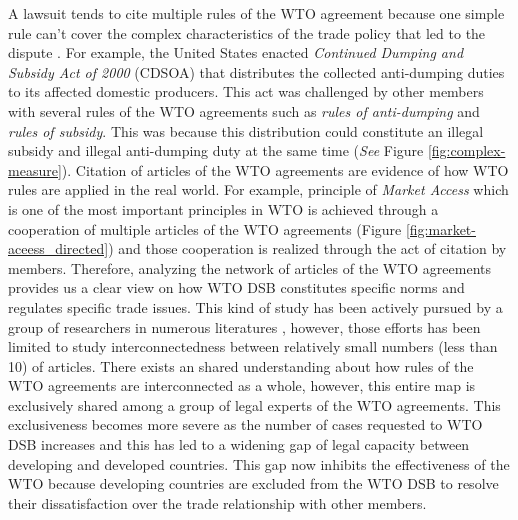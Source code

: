 A lawsuit tends to cite multiple rules of the WTO agreement because one simple rule can't cover the complex characteristics of the trade policy that led to the dispute \citep{palmeter2004dispute}.
For example, the United States enacted \textit{Continued Dumping and Subsidy Act of 2000} (CDSOA) that distributes
the collected anti-dumping duties to its affected domestic producers.
This act was challenged by other members with several rules of
the WTO agreements such as \textit{rules of anti-dumping} and \textit{rules of subsidy}. This was because
this distribution could constitute an illegal subsidy and illegal anti-dumping duty at the same time (\textit{See} Figure \ref{fig:complex-measure}).
Citation of articles of the WTO agreements are evidence of how WTO rules are applied in the real world.
For example, principle of \textit{Market Access} which is one of the most important principles in WTO is achieved through a cooperation of multiple articles of the WTO agreements (Figure \ref{fig:market-aceess_directed}) and those cooperation is realized through the act of citation by members.
Therefore, analyzing the network of articles of the WTO agreements provides us a clear view on how WTO DSB constitutes specific norms and regulates specific trade issues.
This kind of study has been actively pursued by a group of researchers in numerous literatures \citep{chadXXIII, charnovitz, Trachtman, who_gets}, however, those efforts has been limited to
study interconnectedness between relatively small numbers (less than 10) of articles. %
There exists an shared understanding about how rules of the WTO agreements are interconnected as a whole, however, this entire map is exclusively shared among a group of legal experts of the WTO agreements.
This exclusiveness becomes more severe as the number of cases requested to WTO DSB increases and this has led to a widening gap of legal capacity between developing and developed countries.
This gap now inhibits the effectiveness of the WTO because developing countries are excluded from the WTO DSB to resolve their dissatisfaction over the trade relationship with other members.
